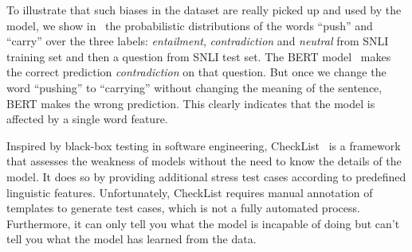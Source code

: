 To illustrate that such biases in the dataset are really picked up and
used by the model, we show in~ the probabilistic 
distributions of the words ``push'' and ``carry'' over the 
three labels: \textit{entailment}, \textit{contradiction} and 
\textit{neutral} from SNLI~\cite{bowman2015large} training set 
and then a question from SNLI test set. The BERT model~\cite{devlin2018bert}  
makes the correct prediction \textit{contradiction} on that question. 
But once we change the word ``pushing''
to ``carrying'' without changing the meaning of the sentence, BERT
makes the wrong prediction.  
This clearly indicates that the model is affected by a single word feature. 



Inspired by black-box testing in software engineering, 
CheckList~\cite{checklist2020acl} is a framework that assesses the weakness of 
models without the need to know the details of the model. It does so by
providing additional stress test cases according to predefined 
linguistic features. Unfortunately, CheckList requires manual annotation 
of templates to generate test cases, which is not a fully automated process. 
Furthermore, it can only tell you what the model is incapable of doing but can't tell 
you what the model has learned from the data.

